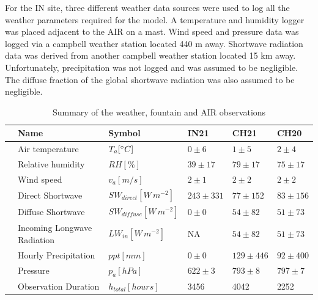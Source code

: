 \documentclass[utf8]{frontiersSCNS} %
\begin{document}
For the IN site, three different weather data sources were used to log all the weather parameters required for the
model. A temperature and humidity logger was placed adjacent to the AIR on a mast. Wind speed and pressure data was
logged via a campbell weather station located 440 m away. Shortwave radiation data was derived from another campbell
weather station located 15 km away. Unfortunately, precipitation was not logged and was assumed to be negligible. The
diffuse fraction of the global shortwave radiation was also assumed to be negligible.

\begin{table}
	\centering
	\caption{ Summary of the weather, fountain and AIR observations}
	\label{tab:Observations}
	\begin{tabular}{@{}|llllll|@{}}
		\toprule
		\textbf{}              & \textbf{Name}               & \textbf{Symbol}           & \textbf{IN21} & \textbf{CH21} & \textbf{CH20} \\ \midrule
		\multicolumn{1}{|l|}{\multirow{9}{*}{\rotatebox[origin=c]{90}{Weather}}}
		                       & Air temperature             & $T_a [\degree C]    $     & $0 \pm 6$     & $1 \pm 5$     & $2 \pm 4$     \\
		\multicolumn{1}{|l|}{} & Relative humidity           & $RH  [\%]        $        & $39 \pm 17$   & $79 \pm 17$   & $75 \pm 17$   \\
		\multicolumn{1}{|l|}{} & Wind speed                  & $v_a [m/s]        $       & $2 \pm 1$     & $2 \pm 2$     & $2 \pm 2$     \\
		\multicolumn{1}{|l|}{} & Direct Shortwave            & $SW_{direct} [W\,m^{-2}]$ & $243 \pm 331$ & $77 \pm 152$  & $83 \pm 156$  \\
		\multicolumn{1}{|l|}{} & Diffuse Shortwave           & $SW_{diffuse}[W\,m^{-2}]$ & $0 \pm 0$     & $54 \pm82$    & $51 \pm 73$   \\
		\multicolumn{1}{|l|}{} & Incoming Longwave Radiation & $LW_{in}[W\,m^{-2}]$      & NA            & $54 \pm82$    & $51 \pm 73$   \\
		\multicolumn{1}{|l|}{} & Hourly Precipitation        & $ppt [mm]       $         & $0 \pm 0$     & $129 \pm 446$ & $92 \pm 400$  \\
		\multicolumn{1}{|l|}{} & Pressure                    & $p_a [hPa]        $       & $622 \pm 3$   & $793 \pm 8$   & $797 \pm7$    \\
		\multicolumn{1}{|l|}{} & Observation Duration        & $h_{total} [hours]$       & 3456          & 4042          & 2252          \\\bottomrule

\end{tabular}
\end{table}
\end{document}
